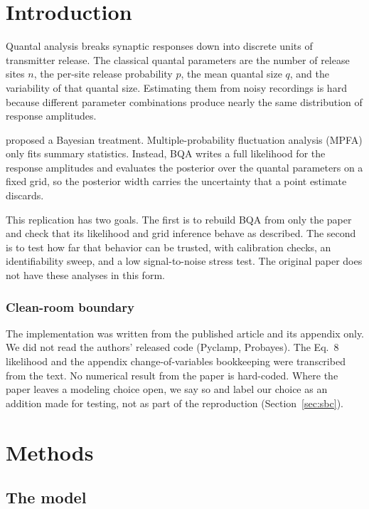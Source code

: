\documentclass[a4paper, oneside, 10pt]{article}
\renewcommand{\citet}[1]{\citeauthor{#1}\supercite{#1}}
\begin{document}
\vspace{1em}

\section{Introduction}

Quantal analysis breaks synaptic responses down into discrete units of transmitter release. The classical quantal parameters are the number of release sites \(n\), the per-site release probability \(p\), the mean quantal size \(q\), and the variability of that quantal size. Estimating them from noisy recordings is hard because different parameter combinations produce nearly the same distribution of response amplitudes.

\citet{bhumbra2013} proposed a Bayesian treatment. Multiple-probability fluctuation analysis (MPFA) only fits summary statistics. Instead, BQA writes a full likelihood for the response amplitudes and evaluates the posterior over the quantal parameters on a fixed grid, so the posterior width carries the uncertainty that a point estimate discards.

This replication has two goals. The first is to rebuild BQA from only the paper and check that its likelihood and grid inference behave as described. The second is to test how far that behavior can be trusted, with calibration checks, an identifiability sweep, and a low signal-to-noise stress test. The original paper does not have these analyses in this form.

\subsubsection{Clean-room boundary}

The implementation was written from the published article and its appendix only. We did not read the authors' released code (Pyclamp, Probayes). The Eq.~8 likelihood and the appendix change-of-variables bookkeeping were transcribed from the text. No numerical result from the paper is hard-coded. Where the paper leaves a modeling choice open, we say so and label our choice as an addition made for testing, not as part of the reproduction (Section~\ref{sec:sbc}).

\section{Methods}

\subsection{The model}
\end{document}
